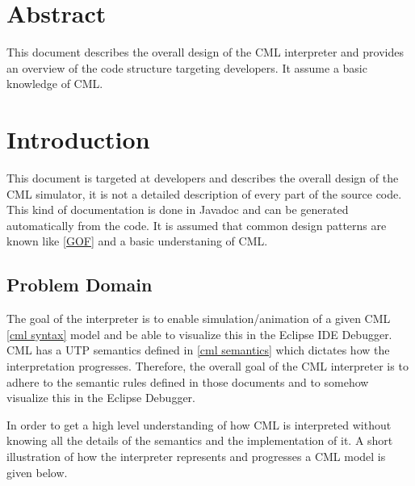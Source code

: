 \documentclass[a4paper, 10pt]{include/compassreport}   %
\begin{document}
\maketitle


\section*{Abstract}
\label{sec:abstract}

This document describes the overall design of the CML
interpreter and provides an overview of the code structure
targeting developers. It assume a basic knowledge of CML.

\newpage

\tableofcontents
\newpage

\section{Introduction}\label{sec:introduction}
This document is targeted at developers and describes the overall
design of the CML simulator, it is not a detailed description of every
part of the source code. This kind of documentation is done in Javadoc
and can be generated automatically from the code. It is assumed that
common design patterns are known like \ref{GOF} and a basic
understaning of CML.

\subsection{Problem Domain}\label{sec:problem_domain}
The goal of the interpreter is to enable simulation/animation of a
given CML \ref{cml syntax} model and be able to visualize this in the
Eclipse IDE Debugger. CML has a UTP semantics defined in \ref{cml
semantics} which dictates how the interpretation progresses. Therefore, the
overall goal of the CML interpreter is to adhere to the semantic
rules defined in those documents and to somehow visualize this in the
Eclipse Debugger.

In order to get a high level understanding of how CML is interpreted
without knowing all the details of the semantics and the
implementation of it. A short illustration of how the interpreter
represents and progresses a CML model is given below. 
\end{document}
